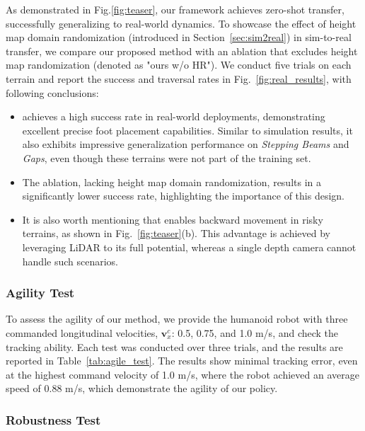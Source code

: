 As demonstrated in Fig.\ref{fig:teaser}, our framework achieves zero-shot transfer, successfully generalizing to real-world dynamics. To showcase the effect of height map domain randomization (introduced in Section~\ref{sec:sim2real}) in sim-to-real transfer, we compare our proposed method with an ablation that excludes height map randomization (denoted as "ours w/o HR"). We conduct five trials on each terrain and report the success and traversal rates in Fig.~\ref{fig:real_results}, with following conclusions:
\begin{itemize}
    \item \beamdojo achieves a high success rate in real-world deployments, demonstrating excellent precise foot placement capabilities. Similar to simulation results, it also exhibits impressive generalization performance on \textit{Stepping Beams} and \textit{Gaps}, even though these terrains were not part of the training set.
    \item The ablation, lacking height map domain randomization, results in a significantly lower success rate, highlighting the importance of this design.
    \item It is also worth mentioning that \beamdojo enables backward movement in risky terrains, as shown in Fig.~\ref{fig:teaser}(b). This advantage is achieved by leveraging LiDAR to its full potential, whereas a single depth camera cannot handle such scenarios.
\end{itemize}

\subsubsection{Agility Test}



To assess the agility of our method, we provide the humanoid robot with three commanded longitudinal velocities, $\mathbf{v}_x^c$: 0.5, 0.75, and 1.0 m/s, and check the tracking ability. Each test was conducted over three trials, and the results are reported in Table~\ref{tab:agile_test}. The results show minimal tracking error, even at the highest command velocity of 1.0 m/s, where the robot achieved an average speed of 0.88 m/s, which demonstrate the agility of our policy.

\subsubsection{Robustness Test}

